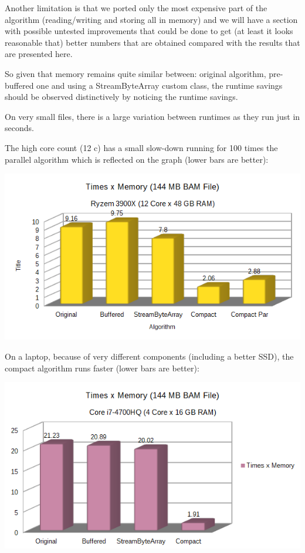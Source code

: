 \documentclass[a4paper,twoside]{article}
\begin{document}
Another limitation is that we ported only the most expensive part of the algorithm (reading/writing and storing all in memory) and we will have a section with possible untested improvements that could be done
to get (at least it looks reasonable that) better numbers that are obtained compared with the results that are presented here.

So given that memory remains quite similar between: original algorithm, pre-buffered one and using a
StreamByteArray custom class, the runtime savings should be observed distinctively by noticing the runtime savings.

On very small files, there is a large variation between runtimes as they run just in seconds.

The high core count (12 c) has a small slow-down running for 100 times the parallel algorithm which is reflected on the graph (lower bars are better):

\begin{center}
	\includegraphics[scale=0.5]{images/times_and_memory_chart_small_144mb_ryzen.png}
\end{center}

On a laptop, because of very different components (including a better SSD), the compact algorithm 
runs faster (lower bars are better):

\begin{center}
	\includegraphics[scale=0.5]{images/times_and_memory_chart_small_144mb_intel.png}
\end{center}
\end{document}
